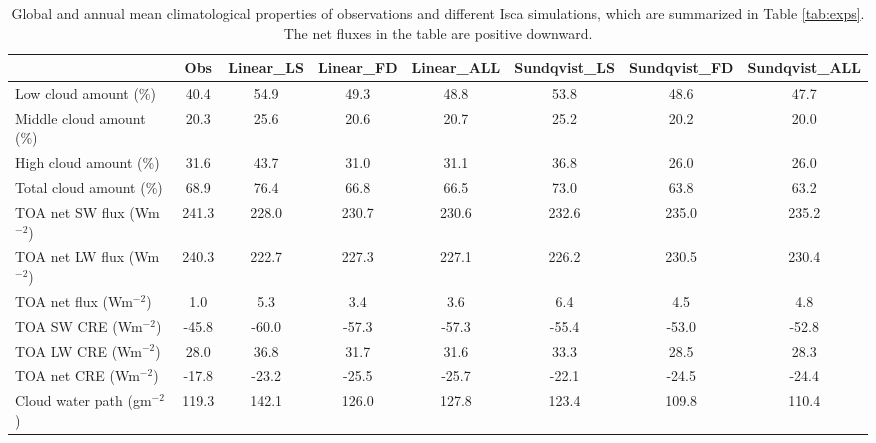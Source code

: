 \begin{table}
	\caption{Global and annual mean climatological properties of observations and different Isca simulations, which are summarized in Table \ref{tab:exps}. The net fluxes in the table are positive downward. }
	\vspace{0.5em}
	\centering
	\renewcommand{\arraystretch}{1.5}
	\begin{threeparttable}
	\begin{tabular}{lccccccc}
    	\toprule
    	{} &   Obs &  Linear\_LS &  Linear\_FD &  Linear\_ALL &  Sundqvist\_LS &  Sundqvist\_FD &  Sundqvist\_ALL \\
    	\midrule
    	Low cloud amount (\%)    &  40.4\tnote{a} &       54.9 &       49.3 &        48.8 &          53.8 &          48.6 &           47.7 \\
        Middle cloud amount (\%) &  20.3\tnote{a} &       25.6 &       20.6 &        20.7 &          25.2 &          20.2 &           20.0 \\
        High cloud amount (\%)   &  31.6\tnote{a} &       43.7 &       31.0 &        31.1 &          36.8 &          26.0 &           26.0 \\
        Total cloud amount (\%)  &  68.9\tnote{a} &       76.4 &       66.8 &        66.5 &          73.0 &          63.8 &           63.2 \\
        TOA net SW flux  (Wm$^{-2}$)        & 241.3\tnote{b} &      228.0 &      230.7 &       230.6 &         232.6 &         235.0 &          235.2 \\
        TOA net LW flux  (Wm$^{-2}$)        & 240.3\tnote{b} &      222.7 &      227.3 &       227.1 &         226.2 &         230.5 &          230.4 \\
        TOA net flux  (Wm$^{-2}$)           &   1.0\tnote{b} &        5.3 &        3.4 &         3.6 &           6.4 &           4.5 &            4.8 \\
        TOA SW CRE (Wm$^{-2}$)              & -45.8\tnote{b} &      -60.0 &      -57.3 &       -57.3 &         -55.4 &         -53.0 &          -52.8 \\
        TOA LW CRE  (Wm$^{-2}$)             &  28.0\tnote{b} &       36.8 &       31.7 &        31.6 &          33.3 &          28.5 &           28.3 \\
        TOA net CRE  (Wm$^{-2}$)            & -17.8\tnote{b} &      -23.2 &      -25.5 &       -25.7 &         -22.1 &         -24.5 &          -24.4 \\
        Cloud water path  (gm$^{-2}$)       & 119.3\tnote{c}&      142.1 &      126.0 &       127.8 &         123.4 &         109.8 &          110.4 \\
    	\bottomrule
    \end{tabular}
    

\end{threeparttable}
\end{table}
